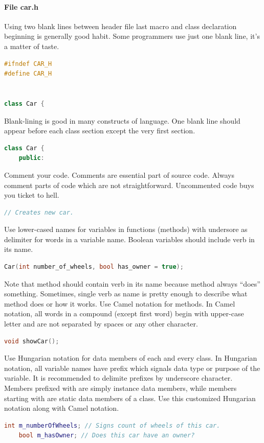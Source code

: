 \paragraph*{File car.h}
Using two blank lines between header file last macro and class declaration beginning is generally good habit. Some programmers use just one blank line, it's a matter of taste.
\begin{lstlisting}[firstnumber=1,language=cpp]
#ifndef CAR_H
#define CAR_H


class Car {
\end{lstlisting}
Blank-lining is good in many constructs of \cpp language. One blank line should appear before each class section except the very first section.
\begin{lstlisting}[firstnumber=5,language=cpp]
class Car {
    public:
\end{lstlisting}
Comment your code. Comments are essential part of source code. Always comment parts of code which are not straightforward. Uncommented code buys you ticket to hell.
\begin{lstlisting}[firstnumber=7,language=cpp]
	// Creates new car.
\end{lstlisting}
Use lower-cased names for variables in functions (methods) with undersore as delimiter for words in a variable name. Boolean variables should include verb in its name.
\begin{lstlisting}[firstnumber=8,language=cpp]
	Car(int number_of_wheels, bool has_owner = true);
\end{lstlisting}
Note that method should contain verb in its name because method always \enquote{does} something. Sometimes, single verb as name is pretty enough to describe what method does or how it works. Use Camel notation for methods. In Camel notation, all words in a compound (except first word) begin with upper-case letter and are not separated by spaces or any other character.
\begin{lstlisting}[firstnumber=11,language=cpp]
	void showCar();
\end{lstlisting}
Use Hungarian notation for data members of each and every class. In Hungarian notation, all variable names have prefix which signals data type or purpose of the variable. It is recommended to delimite prefixes by underscore character. Members prefixed with are simply instance data members, while members starting with are static data members of a class. Use this customized Hungarian notation along with Camel notation.
\begin{lstlisting}[firstnumber=14,language=cpp]
	int m_numberOfWheels; // Signs count of wheels of this car.
	bool m_hasOwner; // Does this car have an owner?
\end{lstlisting}

